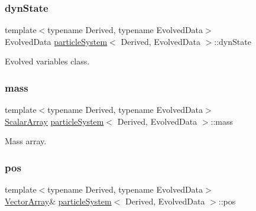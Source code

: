 \mbox{\label{classparticle_system_a68651a7d05d0799f3eda4e785fcec725}} 
\subsubsection{\texorpdfstring{dyn\+State}{dynState}}
{\footnotesize\ttfamily template$<$typename Derived, typename Evolved\+Data$>$ \\
Evolved\+Data \mbox{\hyperlink{classparticle_system}{particle\+System}}$<$ Derived, Evolved\+Data $>$\+::dyn\+State}



Evolved variables class. 

\mbox{\label{classparticle_system_ada52f9d5fc33ca23a9ab6dee96d88957}} 
\subsubsection{\texorpdfstring{mass}{mass}}
{\footnotesize\ttfamily template$<$typename Derived, typename Evolved\+Data$>$ \\
\mbox{\hyperlink{classparticle_system_af7f328120ff85c8b34edeed4a68b746e}{Scalar\+Array}} \mbox{\hyperlink{classparticle_system}{particle\+System}}$<$ Derived, Evolved\+Data $>$\+::mass}



Mass array. 

\mbox{\label{classparticle_system_ae845daf120c9ad16dea4f2ca1df5b11a}} 
\subsubsection{\texorpdfstring{pos}{pos}}
{\footnotesize\ttfamily template$<$typename Derived, typename Evolved\+Data$>$ \\
\mbox{\hyperlink{classparticle_system_a6f66ed187a286c0d42ab2f83b8b6193b}{Vector\+Array}}\& \mbox{\hyperlink{classparticle_system}{particle\+System}}$<$ Derived, Evolved\+Data $>$\+::pos}



